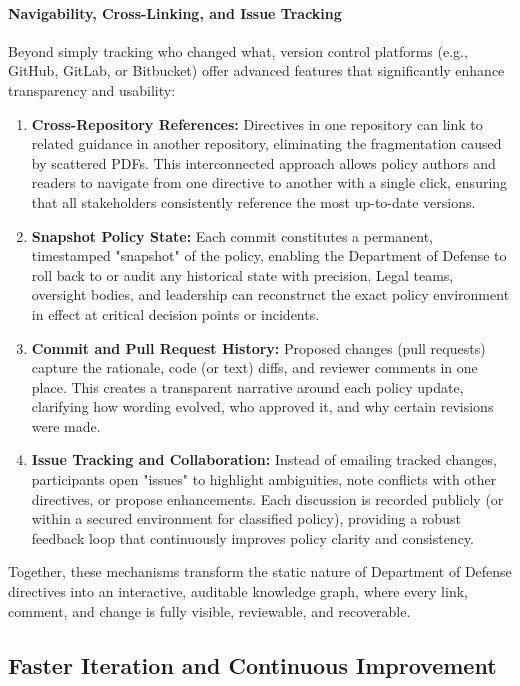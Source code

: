 \documentclass[11pt]{article}
\begin{document}
	\paragraph{Navigability, Cross-Linking, and Issue Tracking}
	Beyond simply tracking who changed what, version control platforms (e.g., GitHub, GitLab, or Bitbucket) offer advanced features that significantly enhance transparency and usability:
	\begin{enumerate}
		\item \textbf{Cross-Repository References:} Directives in one repository can link to related guidance in another repository, eliminating the fragmentation caused by scattered PDFs. This interconnected approach allows policy authors and readers to navigate from one directive to another with a single click, ensuring that all stakeholders consistently reference the most up-to-date versions.
		\item \textbf{Snapshot Policy State:} Each commit constitutes a permanent, timestamped "snapshot" of the policy, enabling the Department of Defense to roll back to or audit any historical state with precision. Legal teams, oversight bodies, and leadership can reconstruct the exact policy environment in effect at critical decision points or incidents.
		\item \textbf{Commit and Pull Request History:} Proposed changes (pull requests) capture the rationale, code (or text) diffs, and reviewer comments in one place. This creates a transparent narrative around each policy update, clarifying how wording evolved, who approved it, and why certain revisions were made.
		\item \textbf{Issue Tracking and Collaboration:} Instead of emailing tracked changes, participants open "issues" to highlight ambiguities, note conflicts with other directives, or propose enhancements. Each discussion is recorded publicly (or within a secured environment for classified policy), providing a robust feedback loop that continuously improves policy clarity and consistency.
	\end{enumerate}

	Together, these mechanisms transform the static nature of Department of Defense directives into an interactive, auditable knowledge graph, where every link, comment, and change is fully visible, reviewable, and recoverable.

	\subsection{Faster Iteration and Continuous Improvement}
\end{document}
